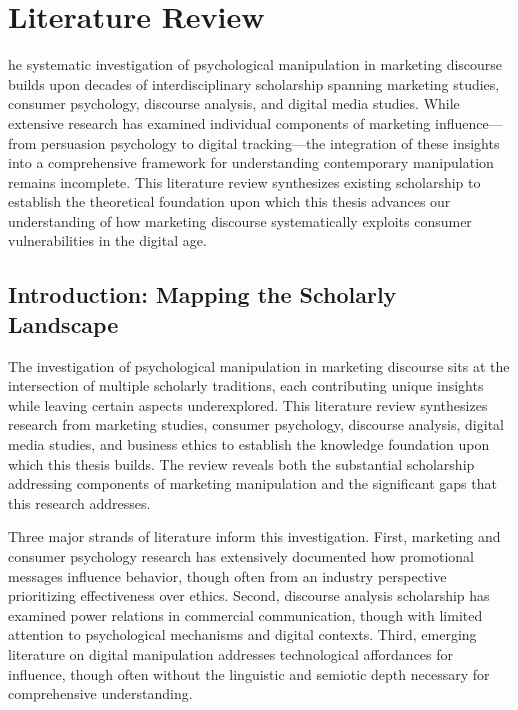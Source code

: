 
\chapter{Literature Review}
\label{ch:literature}

he systematic investigation of psychological manipulation in marketing discourse builds upon decades of interdisciplinary scholarship spanning marketing studies, consumer psychology, discourse analysis, and digital media studies. While extensive research has examined individual components of marketing influence—from persuasion psychology to digital tracking—the integration of these insights into a comprehensive framework for understanding contemporary manipulation remains incomplete. This literature review synthesizes existing scholarship to establish the theoretical foundation upon which this thesis advances our understanding of how marketing discourse systematically exploits consumer vulnerabilities in the digital age.

\section{Introduction: Mapping the Scholarly Landscape}
\label{sec:lit_intro}

The investigation of psychological manipulation in marketing discourse sits at the intersection of multiple scholarly traditions, each contributing unique insights while leaving certain aspects underexplored. This literature review synthesizes research from marketing studies, consumer psychology, discourse analysis, digital media studies, and business ethics to establish the knowledge foundation upon which this thesis builds. The review reveals both the substantial scholarship addressing components of marketing manipulation and the significant gaps that this research addresses.

Three major strands of literature inform this investigation. First, marketing and consumer psychology research has extensively documented how promotional messages influence behavior, though often from an industry perspective prioritizing effectiveness over ethics. Second, discourse analysis scholarship has examined power relations in commercial communication, though with limited attention to psychological mechanisms and digital contexts. Third, emerging literature on digital manipulation addresses technological affordances for influence, though often without the linguistic and semiotic depth necessary for comprehensive understanding.

